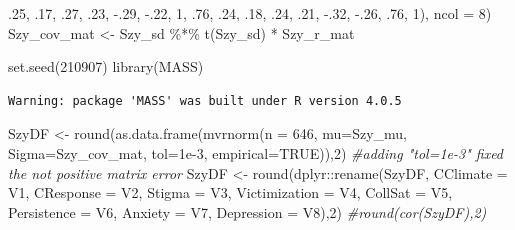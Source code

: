 \documentclass[
  english,
]{book}
\newenvironment{Shaded}{\begin{snugshade}}{\end{snugshade}}
\newcommand{\AttributeTok}[1]{\textcolor[rgb]{0.77,0.63,0.00}{#1}}
\newcommand{\CommentTok}[1]{\textcolor[rgb]{0.56,0.35,0.01}{\textit{#1}}}
\newcommand{\ConstantTok}[1]{\textcolor[rgb]{0.00,0.00,0.00}{#1}}
\newcommand{\DecValTok}[1]{\textcolor[rgb]{0.00,0.00,0.81}{#1}}
\newcommand{\FloatTok}[1]{\textcolor[rgb]{0.00,0.00,0.81}{#1}}
\newcommand{\FunctionTok}[1]{\textcolor[rgb]{0.00,0.00,0.00}{#1}}
\newcommand{\NormalTok}[1]{#1}
\newcommand{\OtherTok}[1]{\textcolor[rgb]{0.56,0.35,0.01}{#1}}
\newcommand{\SpecialCharTok}[1]{\textcolor[rgb]{0.00,0.00,0.00}{#1}}
\begin{document}
\begin{Shaded}
\begin{Highlighting}[]
\NormalTok{                  .}\DecValTok{25}\NormalTok{, .}\DecValTok{17}\NormalTok{,  .}\DecValTok{27}\NormalTok{,  .}\DecValTok{23}\NormalTok{,  }\SpecialCharTok{{-}}\NormalTok{.}\DecValTok{29}\NormalTok{, }\SpecialCharTok{{-}}\NormalTok{.}\DecValTok{22}\NormalTok{, }\DecValTok{1}\NormalTok{, .}\DecValTok{76}\NormalTok{,}
\NormalTok{                  .}\DecValTok{24}\NormalTok{,  .}\DecValTok{18}\NormalTok{, .}\DecValTok{24}\NormalTok{, .}\DecValTok{21}\NormalTok{, }\SpecialCharTok{{-}}\NormalTok{.}\DecValTok{32}\NormalTok{,  }\SpecialCharTok{{-}}\NormalTok{.}\DecValTok{26}\NormalTok{, .}\DecValTok{76}\NormalTok{,  }\DecValTok{1}\NormalTok{), }\AttributeTok{ncol =} \DecValTok{8}\NormalTok{)}
\NormalTok{Szy\_cov\_mat }\OtherTok{\textless{}{-}}\NormalTok{ Szy\_sd }\SpecialCharTok{\%*\%} \FunctionTok{t}\NormalTok{(Szy\_sd) }\SpecialCharTok{*}\NormalTok{ Szy\_r\_mat}

\FunctionTok{set.seed}\NormalTok{(}\DecValTok{210907}\NormalTok{)}
\FunctionTok{library}\NormalTok{(MASS)}
\end{Highlighting}
\end{Shaded}

\begin{verbatim}
Warning: package 'MASS' was built under R version 4.0.5
\end{verbatim}

\begin{Shaded}
\begin{Highlighting}[]
\NormalTok{SzyDF }\OtherTok{\textless{}{-}} \FunctionTok{round}\NormalTok{(}\FunctionTok{as.data.frame}\NormalTok{(}\FunctionTok{mvrnorm}\NormalTok{(}\AttributeTok{n =} \DecValTok{646}\NormalTok{, }\AttributeTok{mu=}\NormalTok{Szy\_mu, }\AttributeTok{Sigma=}\NormalTok{Szy\_cov\_mat, }\AttributeTok{tol=}\FloatTok{1e{-}3}\NormalTok{, }\AttributeTok{empirical=}\ConstantTok{TRUE}\NormalTok{)),}\DecValTok{2}\NormalTok{) }\CommentTok{\#adding "tol=1e{-}3" fixed the not positive matrix error}
\NormalTok{SzyDF }\OtherTok{\textless{}{-}} \FunctionTok{round}\NormalTok{(dplyr}\SpecialCharTok{::}\FunctionTok{rename}\NormalTok{(SzyDF, }\AttributeTok{CClimate =}\NormalTok{ V1, }\AttributeTok{CResponse =}\NormalTok{ V2, }\AttributeTok{Stigma =}\NormalTok{ V3, }\AttributeTok{Victimization =}\NormalTok{ V4, }\AttributeTok{CollSat =}\NormalTok{ V5, }\AttributeTok{Persistence =}\NormalTok{ V6, }\AttributeTok{Anxiety =}\NormalTok{ V7, }\AttributeTok{Depression =}\NormalTok{ V8),}\DecValTok{2}\NormalTok{)}
\CommentTok{\#round(cor(SzyDF),2)}
\end{Highlighting}
\end{Shaded}
\end{document}
